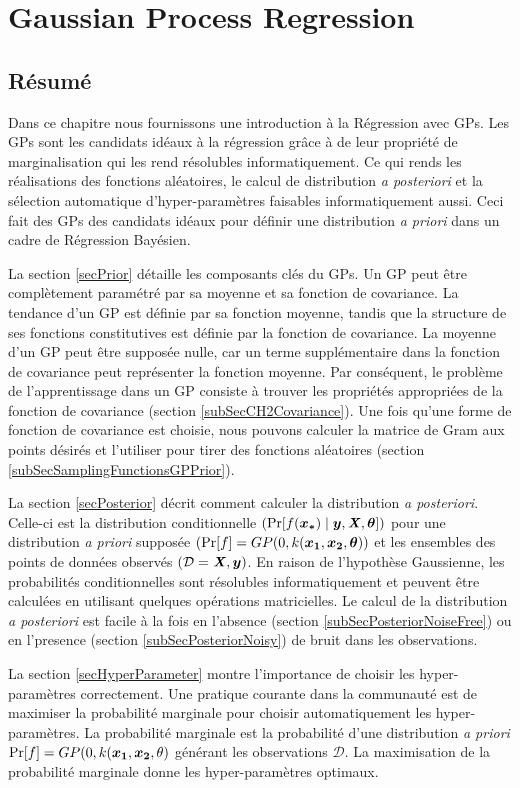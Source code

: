 \chapter{Gaussian Process Regression}
\label{chapGp}

\begin{mdframed}[hidealllines=true,backgroundcolor=lightgray!20]
\section*{Résumé}
Dans ce chapitre nous fournissons une introduction à la Régression avec GPs. Les GPs sont les candidats idéaux à la régression grâce à de leur propriété de marginalisation qui les rend résolubles  informatiquement. Ce qui rends les réalisations des fonctions aléatoires, le calcul de distribution \textit{a posteriori} et la sélection automatique d'hyper-paramètres faisables informatiquement aussi. Ceci fait des GPs des candidats idéaux pour définir une distribution \textit{a priori} dans un cadre de Régression Bayésien. 

La section \ref{secPrior} détaille les composants clés du GPs. Un GP peut être complètement paramétré par sa moyenne et sa fonction de covariance. La tendance d'un GP est définie par sa fonction moyenne, tandis que la structure de ses fonctions constitutives est définie par la fonction de covariance. La moyenne d'un GP peut être supposée nulle, car un terme supplémentaire dans la fonction de covariance peut représenter la fonction moyenne. Par conséquent, le problème de l'apprentissage dans un GP consiste à trouver les propriétés appropriées de la fonction de covariance (section  \ref{subSecCH2Covariance}). Une fois qu'une forme de fonction de covariance est choisie, nous pouvons calculer la matrice de Gram aux points désirés et l'utiliser pour tirer des fonctions aléatoires (section \ref{subSecSamplingFunctionsGPPrior}).

La section \ref{secPosterior} décrit comment calculer la distribution \textit{a posteriori}. Celle-ci est la distribution conditionnelle $(\Pr[f(\boldsymbol{x_{*}}) \mid \boldsymbol{y}, \bm{\mathit{X}}, \boldsymbol{\theta}])$  pour une distribution \textit{a priori} supposée $(\Pr[f] = GP(0, k(\boldsymbol{x_1}, \boldsymbol{x_2}, \boldsymbol{\theta}))$  et les ensembles des points de données observés $(\mathcal{D} = {\bm{\mathit{X}}, \boldsymbol{y}})$. En raison de l'hypothèse  Gaussienne, les probabilités conditionnelles sont résolubles informatiquement et peuvent être calculées en utilisant quelques opérations matricielles. Le calcul de la distribution \textit{a posteriori} est facile à la fois en l'absence (section \ref{subSecPosteriorNoiseFree}) ou en l'presence (section \ref{subSecPosteriorNoisy}) de bruit dans les observations.

La section \ref{secHyperParameter} montre l'importance de choisir les hyper-paramètres correctement. Une pratique courante dans la communauté est de maximiser la probabilité marginale pour choisir automatiquement les hyper-paramètres. La probabilité marginale est la probabilité d'une distribution \textit{a priori} $\Pr[f] = GP(0, k(\boldsymbol{x_1}, \boldsymbol{x_2}, \theta)$  générant les observations $ \mathcal{D} $. La maximisation de la probabilité marginale donne les hyper-paramètres optimaux.
\end{mdframed}


